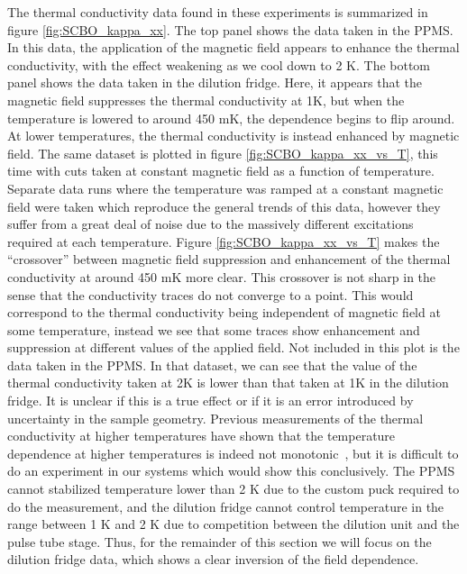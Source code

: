 \documentclass{thesis-umich}
\begin{document}
The thermal conductivity data found in these experiments is summarized in figure \ref{fig:SCBO_kappa_xx}. The top panel shows the data taken in the PPMS. In this data, the application of the magnetic field appears to enhance the thermal conductivity, with the effect weakening as we cool down to 2 K. The bottom panel shows the data taken in the dilution fridge. Here, it appears that the magnetic field suppresses the thermal conductivity at 1K, but when the temperature is lowered to around 450 mK, the dependence begins to flip around. At lower temperatures, the thermal conductivity is instead enhanced by magnetic field. The same dataset is plotted in figure \ref{fig:SCBO_kappa_xx_vs_T}, this time with cuts taken at constant magnetic field as a function of temperature. Separate data runs where the temperature was ramped at a constant magnetic field were taken which reproduce the general trends of this data, however they suffer from a great deal of noise due to the massively different excitations required at each temperature. Figure \ref{fig:SCBO_kappa_xx_vs_T} makes the ``crossover'' between magnetic field suppression and enhancement of the thermal conductivity at around 450 mK more clear. This crossover is not sharp in the sense that the conductivity traces do not converge to a point. This would correspond to the thermal conductivity being independent of magnetic field at some temperature, instead we see that some traces show enhancement and suppression at different values of the applied field. Not included in this plot is the data taken in the PPMS. In that dataset, we can see that the value of the thermal conductivity taken at 2K is lower than that taken at 1K in the dilution fridge. It is unclear if this is a true effect or if it is an error introduced by uncertainty in the sample geometry. Previous measurements of the thermal conductivity at higher temperatures have shown that the temperature dependence at higher temperatures is indeed not monotonic~\cite{Hofmann2001}, but it is difficult to do an experiment in our systems which would show this conclusively. The PPMS cannot stabilized temperature lower than 2 K due to the custom puck required to do the measurement, and the dilution fridge cannot control temperature in the range between 1 K and 2 K due to competition between the dilution unit and the pulse tube stage. Thus, for the remainder of this section we will focus on the dilution fridge data, which shows a clear inversion of the field dependence.
\end{document}
